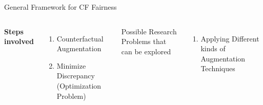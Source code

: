 \documentclass[aspectratio=169,xcolor=dvipsnames]{beamer}
\begin{document}
	
	\begin{frame}{General Framework for CF Fairness}
		\begin{columns}[c] %
			
			\textbf{Steps involved}
			\begin{enumerate}
				\item Counterfactual Augmentation
				\item Minimize Discrepancy (Optimization Problem)
			\end{enumerate}
			
			Possible Research Problems that can be explored
			\begin{enumerate}
				\item Applying Different kinds of Augmentation Techniques
			\end{enumerate}
			
		\end{columns}
	\end{frame}
	
\end{document}
